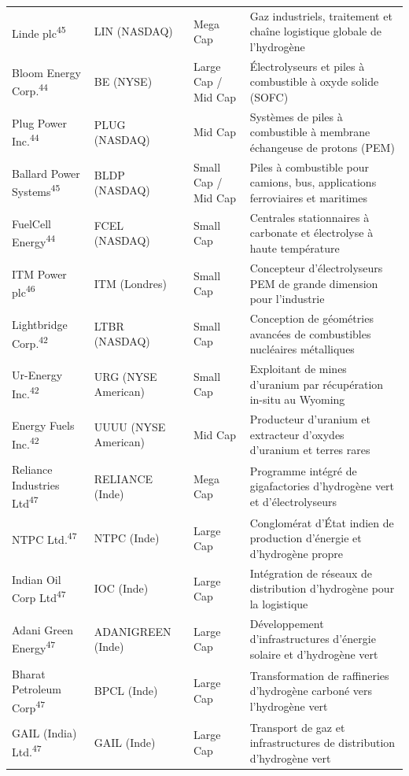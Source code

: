 \documentclass[11pt,a4paper]{article}
\begin{document}
\begin{longtable}{p{3cm} p{3.5cm} p{3cm} p{5cm}}
Linde plc\textsuperscript{45} & LIN (NASDAQ) & Mega Cap & Gaz industriels, traitement et chaîne logistique globale de l'hydrogène \\
Bloom Energy Corp.\textsuperscript{44} & BE (NYSE) & Large Cap / Mid Cap & Électrolyseurs et piles à combustible à oxyde solide (SOFC) \\
Plug Power Inc.\textsuperscript{44} & PLUG (NASDAQ) & Mid Cap & Systèmes de piles à combustible à membrane échangeuse de protons (PEM) \\
Ballard Power Systems\textsuperscript{45} & BLDP (NASDAQ) & Small Cap / Mid Cap & Piles à combustible pour camions, bus, applications ferroviaires et maritimes \\
FuelCell Energy\textsuperscript{44} & FCEL (NASDAQ) & Small Cap & Centrales stationnaires à carbonate et électrolyse à haute température \\
ITM Power plc\textsuperscript{46} & ITM (Londres) & Small Cap & Concepteur d'électrolyseurs PEM de grande dimension pour l'industrie \\
Lightbridge Corp.\textsuperscript{42} & LTBR (NASDAQ) & Small Cap & Conception de géométries avancées de combustibles nucléaires métalliques \\
Ur-Energy Inc.\textsuperscript{42} & URG (NYSE American) & Small Cap & Exploitant de mines d'uranium par récupération in-situ au Wyoming \\
Energy Fuels Inc.\textsuperscript{42} & UUUU (NYSE American) & Mid Cap & Producteur d'uranium et extracteur d'oxydes d'uranium et terres rares \\
Reliance Industries Ltd\textsuperscript{47} & RELIANCE (Inde) & Mega Cap & Programme intégré de gigafactories d'hydrogène vert et d'électrolyseurs \\
NTPC Ltd.\textsuperscript{47} & NTPC (Inde) & Large Cap & Conglomérat d'État indien de production d'énergie et d'hydrogène propre \\
Indian Oil Corp Ltd\textsuperscript{47} & IOC (Inde) & Large Cap & Intégration de réseaux de distribution d'hydrogène pour la logistique \\
Adani Green Energy\textsuperscript{47} & ADANIGREEN (Inde) & Large Cap & Développement d'infrastructures d'énergie solaire et d'hydrogène vert \\
Bharat Petroleum Corp\textsuperscript{47} & BPCL (Inde) & Large Cap & Transformation de raffineries d'hydrogène carboné vers l'hydrogène vert \\
GAIL (India) Ltd.\textsuperscript{47} & GAIL (Inde) & Large Cap & Transport de gaz et infrastructures de distribution d'hydrogène vert \\

\end{longtable}
\end{document}

